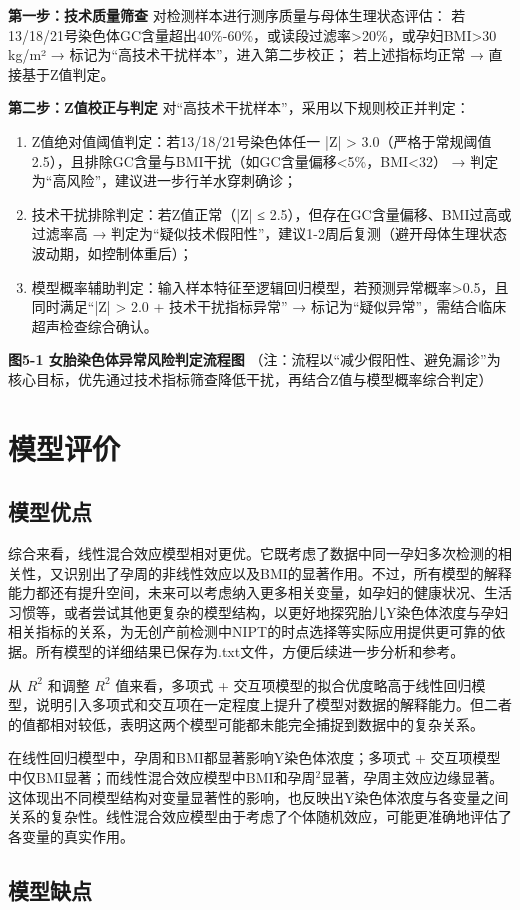 \documentclass[withoutpreface,bwprint]{cumcmthesis} %
\begin{document}
\textbf{第一步：技术质量筛查}
对检测样本进行测序质量与母体生理状态评估：  
若13/18/21号染色体GC含量超出40\%-60\%，或读段过滤率>20\%，或孕妇BMI>30 kg/m² → 标记为“高技术干扰样本”，进入第二步校正；  
若上述指标均正常 → 直接基于Z值判定。

\textbf{第二步：Z值校正与判定}
对“高技术干扰样本”，采用以下规则校正并判定：
\begin{enumerate}
    \item Z值绝对值阈值判定：若13/18/21号染色体任一 |Z| > 3.0（严格于常规阈值2.5），且排除GC含量与BMI干扰（如GC含量偏移<5\%，BMI<32） → 判定为“高风险”，建议进一步行羊水穿刺确诊；
    \item 技术干扰排除判定：若Z值正常（|Z| ≤ 2.5），但存在GC含量偏移、BMI过高或过滤率高 → 判定为“疑似技术假阳性”，建议1-2周后复测（避开母体生理状态波动期，如控制体重后）；
    \item 模型概率辅助判定：输入样本特征至逻辑回归模型，若预测异常概率>0.5，且同时满足“|Z| > 2.0 + 技术干扰指标异常” → 标记为“疑似异常”，需结合临床超声检查综合确认。
\end{enumerate}

\textbf{图5-1 女胎染色体异常风险判定流程图}
（注：流程以“减少假阳性、避免漏诊”为核心目标，优先通过技术指标筛查降低干扰，再结合Z值与模型概率综合判定）


\section{模型评价}
\subsection{模型优点}

综合来看，线性混合效应模型相对更优。它既考虑了数据中同一孕妇多次检测的相关性，又识别出了孕周的非线性效应以及BMI的显著作用。不过，所有模型的解释能力都还有提升空间，未来可以考虑纳入更多相关变量，如孕妇的健康状况、生活习惯等，或者尝试其他更复杂的模型结构，以更好地探究胎儿Y染色体浓度与孕妇相关指标的关系，为无创产前检测中NIPT的时点选择等实际应用提供更可靠的依据。所有模型的详细结果已保存为.txt文件，方便后续进一步分析和参考。 


从 $R^2$ 和调整 $R^2$ 值来看，多项式 + 交互项模型的拟合优度略高于线性回归模型，说明引入多项式和交互项在一定程度上提升了模型对数据的解释能力。但二者的值都相对较低，表明这两个模型可能都未能完全捕捉到数据中的复杂关系。

在线性回归模型中，孕周和BMI都显著影响Y染色体浓度；多项式 + 交互项模型中仅BMI显著；而线性混合效应模型中BMI和孕周$^2$显著，孕周主效应边缘显著。这体现出不同模型结构对变量显著性的影响，也反映出Y染色体浓度与各变量之间关系的复杂性。线性混合效应模型由于考虑了个体随机效应，可能更准确地评估了各变量的真实作用。


\subsection{模型缺点}




\begin{appendices}
\end{appendices}
\end{document}

